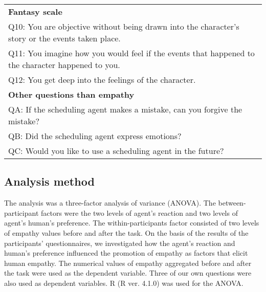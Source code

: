 \documentclass[runningheads]{llncs}
\begin{document}
\begin{table*}[tbp]
{\begin{tabular}{l}
        \textbf{Fantasy scale}\\
        Q10: You are objective without being drawn into the character's story or the events taken place.\\
        Q11: You imagine how you would feel if the events that happened to the character happened to you.\\
        Q12: You get deep into the feelings of the character.\\\hline
        \textbf{Other questions than empathy}\\ \hline
        QA: If the scheduling agent makes a mistake, can you forgive the mistake?\\ 
        QB: Did the scheduling agent express emotions?\\ 
        QC: Would you like to use a scheduling agent in the future?\\ 
        \hline
    \end{tabular}}
    \label{table2}
\end{table*}

\subsection{Analysis method}
The analysis was a three-factor analysis of variance (ANOVA). 
The between-participant factors were the two levels of agent's reaction and two levels of agent's human's preference. 
The within-participants factor consisted of two levels of empathy values before and after the task.
On the basis of the results of the participants' questionnaires, we investigated how the agent's reaction and human's preference influenced the promotion of empathy as factors that elicit human empathy. 
The numerical values of empathy aggregated before and after the task were used as the dependent variable. 
Three of our own questions were also used as dependent variables. R (R ver. 4.1.0) was used for the ANOVA. 
\end{document}
